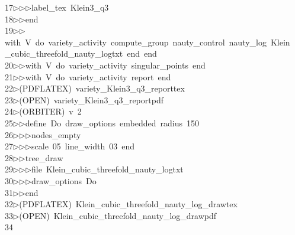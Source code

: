 \begin{tabbing}
17\>$\triangleright$\>$\triangleright$\>$\triangleright$\>label\_tex\ Klein3\_q3\ \\[0pt]
18\>$\triangleright$\>$\triangleright$\>end\ \\[0pt]
19\>$\triangleright$\>$\triangleright$\>with\ V\ do\ variety\_activity\ compute\_group\ nauty\_control\ nauty\_log\ Klein\\[0pt]
\>\_cubic\_threefold\_nauty\_logtxt\ end\ end\ \\[0pt]
20\>$\triangleright$\>$\triangleright$\>with\ V\ do\ variety\_activity\ singular\_points\ end\ \\[0pt]
21\>$\triangleright$\>$\triangleright$\>with\ V\ do\ variety\_activity\ report\ end\\[0pt]
22\>$\triangleright$\>(PDFLATEX)\ variety\_Klein3\_q3\_reporttex\\[0pt]
23\>$\triangleright$\>(OPEN)\ variety\_Klein3\_q3\_reportpdf\\[0pt]
24\>$\triangleright$\>(ORBITER)\ v\ 2\ \\[0pt]
25\>$\triangleright$\>$\triangleright$\>define\ Do\ draw\_options\ embedded\ radius\ 150\ \\[0pt]
26\>$\triangleright$\>$\triangleright$\>$\triangleright$\>nodes\_empty\ \\[0pt]
27\>$\triangleright$\>$\triangleright$\>$\triangleright$\>scale\ 05\ line\_width\ 03\ end\ \\[0pt]
28\>$\triangleright$\>$\triangleright$\>tree\_draw\ \\[0pt]
29\>$\triangleright$\>$\triangleright$\>$\triangleright$\>file\ Klein\_cubic\_threefold\_nauty\_logtxt\ \\[0pt]
30\>$\triangleright$\>$\triangleright$\>$\triangleright$\>draw\_options\ Do\ \\[0pt]
31\>$\triangleright$\>$\triangleright$\>end\\[0pt]
32\>$\triangleright$\>(PDFLATEX)\ Klein\_cubic\_threefold\_nauty\_log\_drawtex\\[0pt]
33\>$\triangleright$\>(OPEN)\ Klein\_cubic\_threefold\_nauty\_log\_drawpdf\\[0pt]
34\>\end{tabbing}
